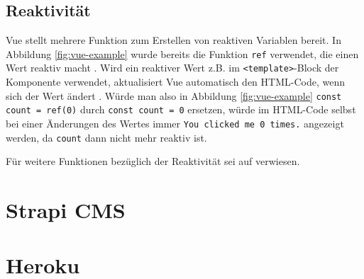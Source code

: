 %
%
\subsection{Reaktivität}
Vue stellt mehrere Funktion zum Erstellen von reaktiven Variablen bereit. In Abbildung \ref{fig:vue-example} wurde bereits die Funktion \lstinline{ref} verwendet, die einen Wert reaktiv macht \cite[vgl.][]{VueApiReactiveCore}. Wird ein reaktiver Wert z.B. im \lstinline{<template>}-Block der Komponente verwendet, aktualisiert Vue automatisch den HTML-Code, wenn sich der Wert ändert \cite[vgl.][]{VueReactiveFundamentals}. Würde man also in Abbildung \ref{fig:vue-example} \glqq \lstinline{const count = ref(0)}\grqq{} durch \glqq \lstinline{const count = 0}\grqq{} ersetzen, würde im HTML-Code selbst bei einer Änderungen des Wertes immer \glqq \lstinline{You clicked me 0 times.}\grqq{} angezeigt werden, da \lstinline{count} dann nicht mehr reaktiv ist.

Für weitere Funktionen bezüglich der Reaktivität sei auf \cite[vgl.][]{VueApiReactiveCore} verwiesen.

%
%
\section{Strapi CMS}

%
%
\section{Heroku}
